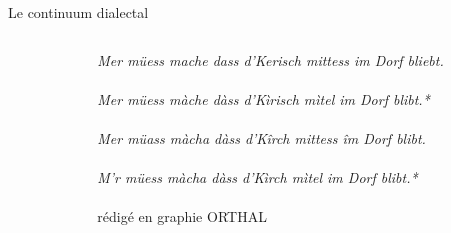\documentclass[french]{beamer}
\begin{document}
\begin{frame}{Le continuum dialectal}
  \begin{columns}
    \begin{column}{0.25\textwidth}
    \end{column}
    \begin{column}{0.85\textwidth}
      \small
      \textit{\textcolor{nla}{Mer müess mache dass d'Kerisch mittess im Dorf bliebt.} \\~\\ %
        \textcolor{nla}{Mer müess màche  dàss d'Kìrisch mìtel im Dorf blibt}.*\\~\\ %
        \textcolor{sla}{Mer müass màcha dàss d’Kîrch mittess îm Dorf blibt}.\\~\\ %
        \textcolor{sla}{M'r müess màcha dàss d'Kìrch mìtel im Dorf blibt}.* \\~\\  %
      }
      \footnotesize *rédigé en graphie ORTHAL \footnotemark[1] \\~\\ 
    \end{column}
  \end{columns}
  \begin{center}
    \normalsize
  \end{center}
\end{frame}
\end{document}
